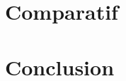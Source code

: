 \documentclass[10pt,a4paper,titlepage]{article}
\begin{document}
\newpage
\section{Comparatif}

\newpage
\section{Conclusion}

% 
% 
% 
% 
\end{document}
